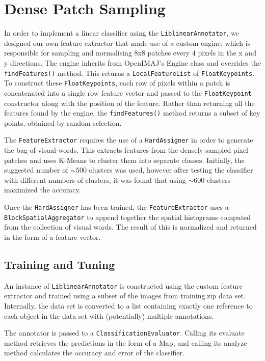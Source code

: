 \documentclass[a4paper]{article}
\begin{document}
\section{Dense Patch Sampling}
In order to implement a linear classifier using the \texttt{LiblinearAnnotator}, we designed our own feature extractor that made use of a custom engine, which is responsible for sampling and normalising 8x8 patches every 4 pixels in the x and y directions. The engine inherits from OpenIMAJ’s Engine class and overrides the \texttt{findFeatures()} method. This returns a \texttt{LocalFeatureList} of \texttt{FloatKeypoints}. To construct these \texttt{FloatKeypoints}, each row of pixels within a patch is concatenated into a single row feature vector and passed to the \texttt{FloatKeypoint} constructor along with the position of the feature. Rather than returning all the features found by the engine, the \texttt{findFeatures()} method returns a subset of key points, obtained by random selection.

The \texttt{FeatureExtractor} requires the use of a \texttt{HardAssigner} in order to generate the bag-of-visual-words. This extracts features from the densely sampled pixel patches and uses K-Means to cluster them into separate classes. Initially, the suggested number of $\sim500$ clusters was used, however after testing the classifier with different numbers of clusters, it was found that using $\sim600$ clusters maximized the accuracy.

Once the \texttt{HardAssigner} has been trained, the \texttt{FeatureExtractor} uses a  \texttt{BlockSpatialAggregator} to append together the spatial histograms computed from the collection of visual words. The result of this is normalized and returned in the form of a feature vector.

\subsection{Training and Tuning}
An instance of \texttt{LiblinearAnnotator} is constructed using the custom feature extractor and trained using a subset of the images from training.zip data set. Internally, the data set is converted to a list containing exactly one reference to each object in the data set with (potentially) multiple annotations. 

The annotator is passed to a \texttt{ClassificationEvaluator}. Calling its evaluate method retrieves the predictions in the form of a Map, and calling its analyze method calculates the accuracy and error of the classifier.
\end{document}
